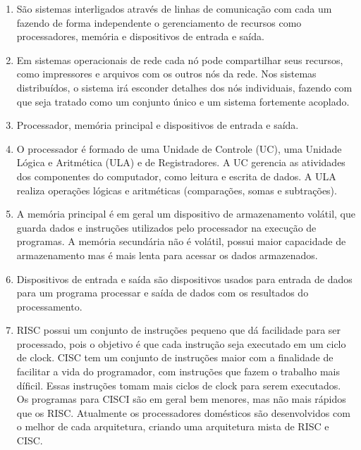 \documentclass[12pt,a4paper]{article}
\begin{document}
\begin{enumerate}
\item
São sistemas interligados através de linhas de comunicação com cada um fazendo
de forma independente o gerenciamento de recursos como processadores, memória
e dispositivos de entrada e saída.

\item
Em sistemas operacionais de rede cada nó pode compartilhar seus recursos,
como impressores e arquivos com os outros nós da rede. Nos sistemas 
distribuídos, o sistema irá esconder detalhes dos nós individuais, fazendo
com que seja tratado como um conjunto único e um sistema fortemente acoplado.

\item
Processador, memória principal e dispositivos de entrada e saída.

\item
O processador é formado de uma Unidade de Controle (UC), uma Unidade Lógica e
Aritmética (ULA) e de Registradores. A UC gerencia as atividades dos 
componentes do computador, como leitura e escrita de dados. A ULA realiza
operações lógicas e aritméticas (comparações, somas e subtrações).

\item
A memória principal é em geral um dispositivo de armazenamento volátil, que
guarda dados e instruções utilizados pelo processador na execução de programas.
A memória secundária não é volátil, possui maior capacidade de armazenamento
mas é mais lenta para acessar os dados armazenados.

\item
Dispositivos de entrada e saída são dispositivos usados para entrada de dados
para um programa processar e saída de dados com os resultados do processamento.

\item
RISC possui um conjunto de instruções pequeno que dá facilidade para ser 
processado, pois o objetivo é que cada instrução seja executado em um ciclo 
de clock.
CISC tem um conjunto de instruções maior com a finalidade de facilitar a vida
do programador, com instruções que fazem o trabalho mais díficil. Essas
instruções tomam mais ciclos de clock para serem executados. Os programas
para CISCI são em geral bem menores, mas não mais rápidos que os RISC. 
Atualmente os processadores domésticos são desenvolvidos com o melhor de
cada arquitetura, criando uma arquitetura mista de RISC e CISC.


\end{enumerate}
\end{document}
